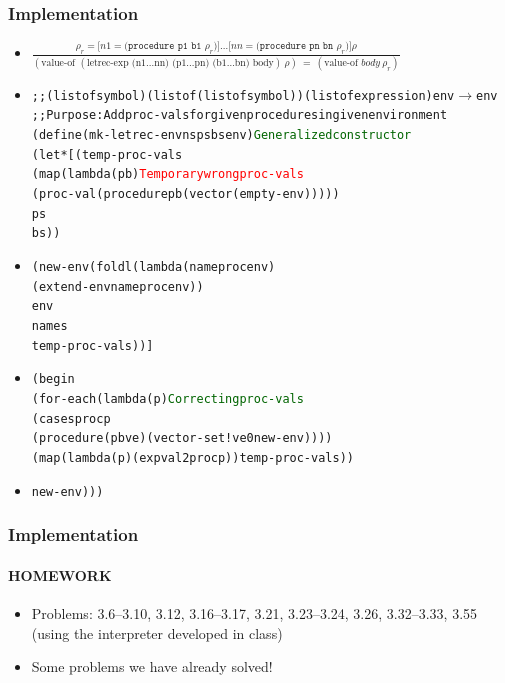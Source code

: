 \documentclass{beamer}
\newcommand{\arrow}{\(\rightarrow\)}
\begin{document}
\begin{frame}[fragile]
\frametitle{Implementation}
\begin{scriptsize}
\begin{itemize}
\item<1->
$\frac{\rho_r = \texttt{[}n1=\texttt{(procedure p1 b1 }\rho_r)\texttt{]}\ldots \texttt{[}nn=\texttt{(procedure pn bn }\rho_r)\texttt{]}\rho}
      {(\text{value-of } (\text{letrec-exp (n1\ldots nn) (p1\ldots pn) (b1\ldots bn) body}) \ \rho) \ = \ (\text{value-of } body \ \rho_r)}$

\item<2->
\begin{alltt}

;; (listof symbol) (listof (listof symbol)) (listof expression) env \arrow{} env
;; Purpose: Add proc-vals for given procedures in given environment
(define (mk-letrec-env ns ps bs env) \textcolor{darkgreen}{Generalized constructor}
  (let* [(temp-proc-vals
           (map (lambda (p b)           \textcolor{red}{Temporary wrong proc-vals}
                  (proc-val (procedure p b (vector (empty-env)))))
                ps
                bs))
\end{alltt}

\item<3->
\begin{alltt}
         (new-env (foldl (lambda (name proc env)
                           (extend-env name proc env))
                         env
                         names
                         temp-proc-vals))]
\end{alltt}

\item<4->
\begin{alltt}
    (begin
      (for-each (lambda (p)   \textcolor{darkgreen}{Correcting proc-vals}
                 (cases proc p
                  (procedure (p b ve) (vector-set! ve 0 new-env))))
                (map (lambda (p) (expval2proc p)) temp-proc-vals))
\end{alltt}

\item<5->
\begin{alltt}
      new-env)))
\end{alltt}

\end{itemize}
\end{scriptsize}
\end{frame}

\begin{frame}[fragile]
\frametitle{Implementation}
\framesubtitle{HOMEWORK}
\begin{scriptsize}
\begin{itemize}
\item<1-> Problems: 3.6--3.10, 3.12, 3.16--3.17, 3.21, 3.23--3.24, 3.26, 3.32--3.33, 3.55 (using the interpreter developed in class)

\item<1-> Some problems we have already solved!


\end{itemize}
\end{scriptsize}
\end{frame}
\end{document}
